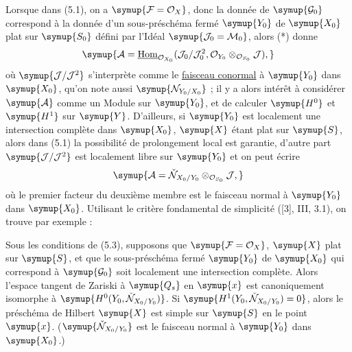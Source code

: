 Lorsque dans (5.1), on a $\symup{\mathcal F=\mathcal O_X}$, donc la donnée de
$\symup{\mathcal G_0}$ correspond à la donnée d'un sous-préschéma fermé $\symup{Y_0}$ de $\symup{X_0}$
plat sur $\symup{S_0}$ défini par l'Idéal $\symup{\mathcal J_0=\mathcal M_0}$, alors (*) donne
\[
\symup{\mathcal A=\underline{\operatorname{Hom}}_{\mathcal O_{X_0}}
(\mathcal J_0/\mathcal J_0^2,
\mathcal O_{Y_0}\otimes_{\mathcal O_{S_0}}\mathcal J),}
\]
où $\symup{\mathcal J/\mathcal J^2}$ s'interprète comme le \uline{faisceau conormal} à $\symup{Y_0}$
dans $\symup{X_0}$, qu'on note aussi
$\symup{\mathcal N_{Y_0/X_0}}$ ; il y a alors intérêt à considérer $\symup{\mathcal A}$
comme un Module sur $\symup{Y_0}$, et de calculer $\symup{H^0}$ et $\symup{H^1}$ sur $\symup{Y}$. D'ailleurs,
si $\symup{Y_0}$ est localement une intersection complète dans $\symup{X_0}$, $\symup{X}$ étant plat
sur $\symup{S}$, alors dans (5.1) la possibilité de prolongement local est garantie,
d'autre part $\symup{\mathcal J/\mathcal J^2}$ est localement libre sur $\symup{Y_0}$ et on peut
écrire
\[
\symup{\mathcal A=\check{\mathcal N}_{X_0/Y_0}\otimes_{\mathcal O_{S_0}}\mathcal J,}
\]
où le premier facteur du deuxième membre est le faisceau normal à $\symup{Y_0}$ dans
$\symup{X_0}$. Utilisant le critère fondamental de simplicité ([3], III, 3.1), on
trouve par exemple :

 Sous les conditions de (5.3), supposons que
$\symup{\mathcal F=\mathcal O_X}$, $\symup{X}$ plat sur $\symup{S}$, et que le sous-préschéma fermé
$\symup{Y_0}$ de $\symup{X_0}$ qui correspond à $\symup{\mathcal G_0}$ soit localement une intersection
complète. Alors l'espace tangent de Zariski à $\symup{Q_s}$ en $\symup{x}$ est canoniquement
isomorphe à $\symup{H^0(Y_0,\check{\mathcal N}_{X_0/Y_0})}$. Si
$\symup{H^1(Y_0,\check{\mathcal N}_{X_0/Y_0})=0}$, alors le préschéma de Hilbert
$\symup{X}$ est simple sur $\symup{S}$ en le point $\symup{x}$.
($\symup{\check{\mathcal N}_{X_0/Y_0}}$ est le faisceau normal à $\symup{Y_0}$ dans $\symup{X_0}$.)

